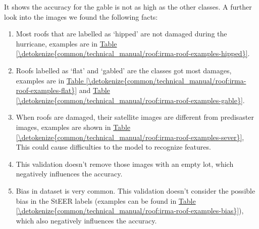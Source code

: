 \documentclass[letterpaper,10pt,english]{sphinxmanual}
\begin{document}
\sphinxAtStartPar
It shows the accuracy for the gable is not as high as the other classes.
A further look into the images we found the following facts:
\begin{enumerate}
%
\item {} 
\sphinxAtStartPar
Most roofs that are labelled as ‘hipped’ are not damaged during the hurricane, examples are in \hyperref[\detokenize{common/technical_manual/roof:irma-roof-examples-hipped}]{Table \ref{\detokenize{common/technical_manual/roof:irma-roof-examples-hipped}}}.

\item {} 
\sphinxAtStartPar
Roofs labelled as ‘flat’ and ‘gabled’ are the classes got most damages, examples are in \hyperref[\detokenize{common/technical_manual/roof:irma-roof-examples-flat}]{Table \ref{\detokenize{common/technical_manual/roof:irma-roof-examples-flat}}} and \hyperref[\detokenize{common/technical_manual/roof:irma-roof-examples-gable}]{Table \ref{\detokenize{common/technical_manual/roof:irma-roof-examples-gable}}}.

\item {} 
\sphinxAtStartPar
When roofs are damaged, their satellite images are different from pre\sphinxhyphen{}disaster images, examples are shown in \hyperref[\detokenize{common/technical_manual/roof:irma-roof-examples-sever}]{Table \ref{\detokenize{common/technical_manual/roof:irma-roof-examples-sever}}}, This could cause difficulties to the model to recognize features.

\item {} 
\sphinxAtStartPar
This validation doesn’t remove those images with an empty lot, which negatively influences the accuracy.

\item {} 
\sphinxAtStartPar
Bias in dataset is very common. This validation doesn’t consider the possible bias in the StEER labels (examples can be found in \hyperref[\detokenize{common/technical_manual/roof:irma-roof-examples-bias}]{Table \ref{\detokenize{common/technical_manual/roof:irma-roof-examples-bias}}}), which also negatively influences the accuracy.

\end{enumerate}
\end{document}

